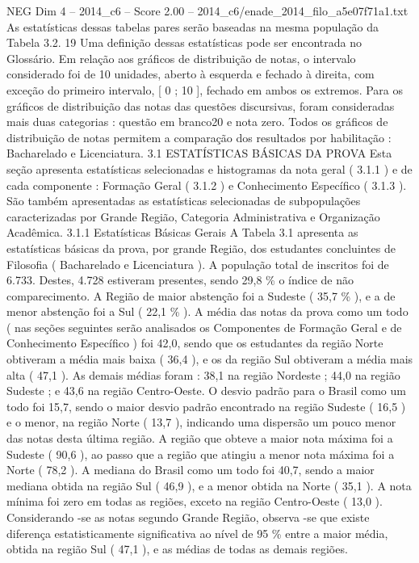 \begin{textsample}{NEG Dim 4 – 2014\_c6 – Score 2.00 – 2014\_c6/enade\_2014\_filo\_a5e07f71a1.txt}
As estatísticas dessas tabelas pares serão baseadas na mesma população da Tabela 3.2. 19 Uma definição dessas estatísticas pode ser encontrada no Glossário.
Em relação aos gráficos de distribuição de notas, o intervalo considerado foi de 10 unidades, aberto à esquerda e fechado à direita, com exceção do primeiro intervalo, [ 0 ; 10 ], fechado em ambos os extremos.
Para os gráficos de distribuição das notas das questões discursivas, foram consideradas mais duas categorias : questão em branco20 e nota zero.
Todos os gráficos de distribuição de notas permitem a comparação dos resultados por habilitação : Bacharelado e Licenciatura. 3.1 ESTATÍSTICAS BÁSICAS DA PROVA Esta seção apresenta estatísticas selecionadas e histogramas da nota geral ( 3.1.1 ) e de cada componente : Formação Geral ( 3.1.2 ) e Conhecimento Específico ( 3.1.3 ).
São também apresentadas as estatísticas selecionadas de subpopulações caracterizadas por Grande Região, Categoria Administrativa e Organização Acadêmica. 3.1.1 Estatísticas Básicas Gerais A Tabela 3.1 apresenta as estatísticas básicas da prova, por grande Região, dos estudantes concluintes de Filosofia ( Bacharelado e Licenciatura ).
A população total de inscritos foi de 6.733.
Destes, 4.728 estiveram presentes, sendo 29,8 \% o índice de não comparecimento.
A Região de maior abstenção foi a Sudeste ( 35,7 \% ), e a de menor abstenção foi a Sul ( 22,1 \% ).
A média das notas da prova como um todo ( nas seções seguintes serão analisados os Componentes de Formação Geral e de Conhecimento Específico ) foi 42,0, sendo que os estudantes da região Norte obtiveram a média mais baixa ( 36,4 ), e os da região Sul obtiveram a média mais alta ( 47,1 ).
As demais médias foram : 38,1 na região Nordeste ; 44,0 na região Sudeste ; e 43,6 na região Centro-Oeste.
O desvio padrão para o Brasil como um todo foi 15,7, sendo o maior desvio padrão encontrado na região Sudeste ( 16,5 ) e o menor, na região Norte ( 13,7 ), indicando uma dispersão um pouco menor das notas desta última região.
A região que obteve a maior nota máxima foi a Sudeste ( 90,6 ), ao passo que a região que atingiu a menor nota máxima foi a Norte ( 78,2 ).
A mediana do Brasil como um todo foi 40,7, sendo a maior mediana obtida na região Sul ( 46,9 ), e a menor obtida na Norte ( 35,1 ).
A nota mínima foi zero em todas as regiões, exceto na região Centro-Oeste ( 13,0 ).
Considerando -se as notas segundo Grande Região, observa -se que existe diferença estatisticamente significativa ao nível de 95 \% entre a maior média, obtida na região Sul ( 47,1 ), e as médias de todas as demais regiões.

\end{textsample}
